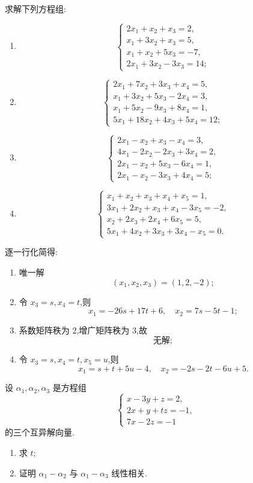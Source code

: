 \begin{example}
求解下列方程组:
\begin{enumerate}
\item
\[
\begin{cases}
2x_1+x_2+x_3=2,\\
x_1+3x_2+x_3=5,\\
x_1+x_2+5x_3=-7,\\
2x_1+3x_2-3x_3=14;
\end{cases}
\]
\item
\[
\begin{cases}
2x_1+7x_2+3x_3+x_4=5,\\
x_1+3x_2+5x_3-2x_4=3,\\
x_1+5x_2-9x_3+8x_4=1,\\
5x_1+18x_2+4x_3+5x_4=12;
\end{cases}
\]
\item
\[
\begin{cases}
2x_1-x_2+x_3-x_4=3,\\
4x_1-2x_2-2x_3+3x_4=2,\\
2x_1-x_2+5x_3-6x_4=1,\\
2x_1-x_2-3x_3+4x_4=5;
\end{cases}
\]
\item
\[
\begin{cases}
x_1+x_2+x_3+x_4+x_5=1,\\
3x_1+2x_2+x_3+x_4-3x_5=-2,\\
x_2+2x_3+2x_4+6x_5=5,\\
5x_1+4x_2+3x_3+3x_4-x_5=0.
\end{cases}
\]
\end{enumerate}
\end{example}
\exampleblank

\begin{solution}
逐一行化简得:
\begin{enumerate}
  \item 唯一解
  \[
  \boxed{(x_1,x_2,x_3)=(1,2,-2)};
  \]
  \item 令 $x_3=s,x_4=t$,则
  \[
  \boxed{
  x_1=-26s+17t+6,
  \quad x_2=7s-5t-1
  };
  \]
  \item 系数矩阵秩为 $2$,增广矩阵秩为 $3$,故
  \[
  \boxed{\text{无解}};
  \]
  \item 令 $x_3=s,x_4=t,x_5=u$,则
  \[
  \boxed{
  x_1=s+t+5u-4,
  \quad
  x_2=-2s-2t-6u+5
  }.
  \]
\end{enumerate}
\end{solution}

\begin{example}
设 $\alpha_1,\alpha_2,\alpha_3$ 是方程组
\[
\begin{cases}
x-3y+z=2,\\2x+y+tz=-1,\\7x-2z=-1\end{cases}
\]
的三个互异解向量.
\begin{enumerate}
  \item 求 $t$;
  \item 证明 $\alpha_1-\alpha_2$ 与 $\alpha_1-\alpha_3$ 线性相关.
\end{enumerate}
\end{example}
\exampleblank

